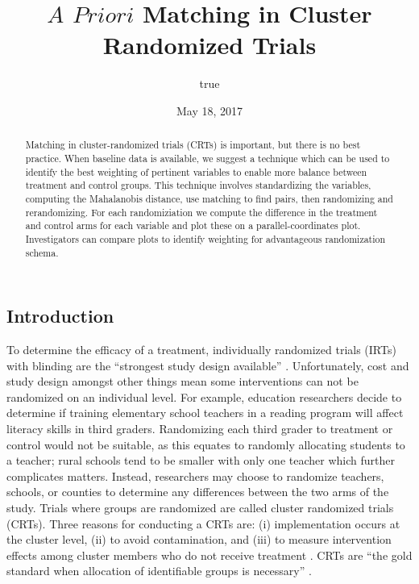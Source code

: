 \documentclass[]{sagej}
\title{\(A\) \(Priori\) Matching in Cluster Randomized Trials}
\author{true}
\date{May 18, 2017}
\begin{document}
\maketitle
\begin{abstract}
Matching in cluster-randomized trials (CRTs) is important, but there is
no best practice. When baseline data is available, we suggest a
technique which can be used to identify the best weighting of pertinent
variables to enable more balance between treatment and control groups.
This technique involves standardizing the variables, computing the
Mahalanobis distance, use matching to find pairs, then randomizing and
rerandomizing. For each randomiziation we compute the difference in the
treatment and control arms for each variable and plot these on a
parallel-coordinates plot. Investigators can compare plots to identify
weighting for advantageous randomization schema.
\end{abstract}

\subsection{Introduction}\label{introduction}

To determine the efficacy of a treatment, individually randomized trials
(IRTs) with blinding are the ``strongest study design available''
\citep{gatsonis2017methods}. Unfortunately, cost and study design
amongst other things mean some interventions can not be randomized on an
individual level. For example, education researchers decide to determine
if training elementary school teachers in a reading program will affect
literacy skills in third graders. Randomizing each third grader to
treatment or control would not be suitable, as this equates to randomly
allocating students to a teacher; rural schools tend to be smaller with
only one teacher which further complicates matters. Instead, researchers
may choose to randomize teachers, schools, or counties to determine any
differences between the two arms of the study. Trials where groups are
randomized are called cluster randomized trials (CRTs). Three reasons
for conducting a CRTs are: (i) implementation occurs at the cluster
level, (ii) to avoid contamination, and (iii) to measure intervention
effects among cluster members who do not receive treatment
\citep{balzer2012match, CRTrials2009}. CRTs are ``the gold standard when
allocation of identifiable groups is necessary''
\citep{murray2004design}.
\end{document}
